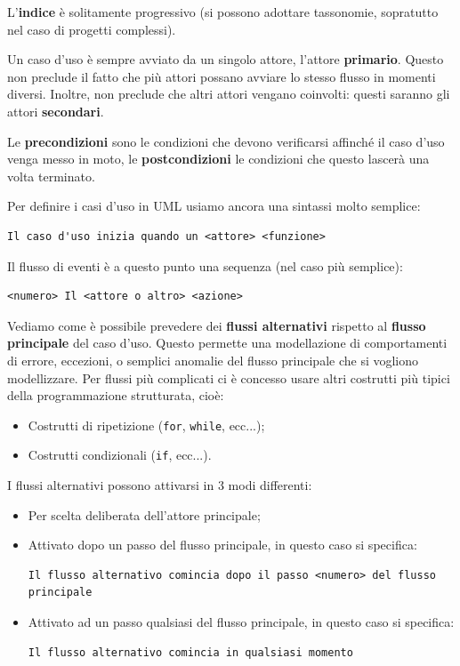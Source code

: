 \documentclass[a4paper,11pt]{article}
\begin{document}
L'\textbf{indice} è solitamente progressivo (si possono adottare tassonomie, sopratutto nel caso di progetti complessi).

Un caso d'uso è sempre avviato da un singolo attore, l'attore \textbf{primario}. Questo non preclude il fatto che più attori possano avviare lo stesso flusso in momenti diversi. Inoltre, non preclude che altri attori vengano coinvolti: questi saranno gli attori \textbf{secondari}.

Le \textbf{precondizioni} sono le condizioni che devono verificarsi affinché il caso d'uso venga messo in moto, le \textbf{postcondizioni} le condizioni che questo lascerà una volta terminato.

Per definire i casi d'uso in UML usiamo ancora una sintassi molto semplice:
\begin{lstlisting}[style=codestyle]	
Il caso d'uso inizia quando un <attore> <funzione>
\end{lstlisting}

Il flusso di eventi è a questo punto una sequenza (nel caso più semplice):
\begin{lstlisting}[style=codestyle]	
<numero> Il <attore o altro> <azione>
\end{lstlisting}
Vediamo come è possibile prevedere dei \textbf{flussi alternativi} rispetto al \textbf{flusso principale} del caso d'uso. Questo permette una modellazione di comportamenti di errore, eccezioni, o semplici anomalie del flusso principale che si vogliono modellizzare.
Per flussi più complicati ci è concesso usare altri costrutti più tipici della programmazione strutturata, cioè:
\begin{itemize}
	\item Costrutti di ripetizione (\lstinline|for|, \lstinline|while|, ecc...);
	\item Costrutti condizionali (\lstinline|if|, ecc...).
\end{itemize}

I flussi alternativi possono attivarsi in 3 modi differenti:
\begin{itemize}
	\item Per scelta deliberata dell'attore principale;
	\item Attivato dopo un passo del flusso principale, in questo caso si specifica:
\begin{lstlisting}[style=codestyle]	
Il flusso alternativo comincia dopo il passo <numero> del flusso principale
\end{lstlisting}
	\item Attivato ad un passo qualsiasi del flusso principale, in questo caso si specifica:
\begin{lstlisting}[style=codestyle]	
Il flusso alternativo comincia in qualsiasi momento 
\end{lstlisting}
\end{itemize}
\end{document}
